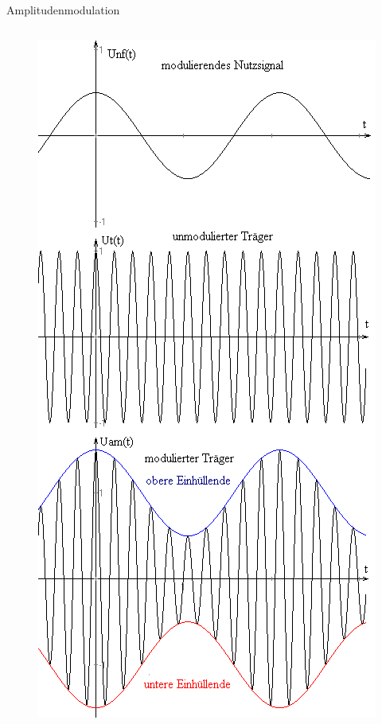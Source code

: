 \begin{frame}{Amplitudenmodulation}
  \begin{columns}[c]
    \begin{figure}
      \includegraphics[width=\textwidth,height=.75\textheight,keepaspectratio]{e14/AM1.png}

\end{figure}
\end{columns}
\end{frame}
